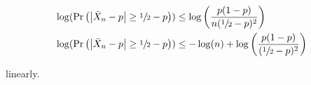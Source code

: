 \documentclass[letterpaper,10pt]{article} %
\newcommand{\pr}[1]{\Pr\left( #1 \right)}
\begin{document}
\begin{align*}
\log ( \pr{\left|\bar{X}_n - p\right| \geq \sfrac{1}{2}-p} ) &\leq \log \left( \frac{p(1-p)}{n(\sfrac{1}{2}-p)^2} \right) \\
\log ( \pr{\left|\bar{X}_n - p\right| \geq \sfrac{1}{2}-p} ) &\leq -\log(n) + \log \left( \frac{p(1-p)}{(\sfrac{1}{2}-p)^2} \right) \\
\end{align*}

linearly.

%
%

\end{document}
